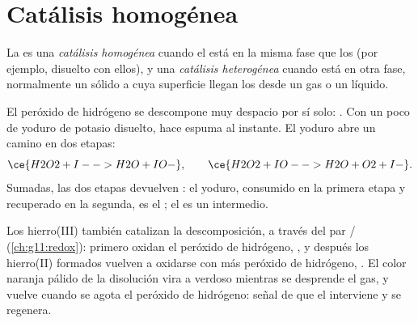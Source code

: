 \section{Catálisis homogénea}

\begin{definition}\label{def:g12:catalysis:homogeneous}
La  es una \emph{catálisis homogénea}
cuando el  está en la misma fase que los  (por
ejemplo, disuelto con ellos), y una \emph{catálisis heterogénea}
cuando está en otra fase, normalmente un sólido a cuya superficie llegan
los  desde un gas o un líquido.
\end{definition}

\begin{example}\label{ex:g12:catalysis:iodide}
El peróxido de hidrógeno se descompone muy despacio por sí solo:
. Con un poco de yoduro de potasio disuelto,
hace espuma al instante. El  yoduro abre un camino en dos etapas:
\[
  \ce{H2O2 + I- -> H2O + IO-}, \qquad
  \ce{H2O2 + IO- -> H2O + O2 + I-} .
\]
Sumadas, las dos etapas devuelven : el  yoduro,
consumido en la primera etapa y recuperado en la segunda, es el
; el   es un intermedio.
\end{example}


\begin{example}\label{ex:g12:catalysis:iron}
Los  hierro(III) también catalizan la descomposición, a través del
par / (\cref{ch:g11:redox}): primero oxidan el
peróxido de hidrógeno, , y
después los  hierro(II) formados vuelven a oxidarse con más
peróxido de hidrógeno,
. El color naranja pálido
de la disolución vira a verdoso mientras se desprende el gas, y vuelve
cuando se agota el peróxido de hidrógeno: señal de que el 
interviene y se regenera.
\end{example}

